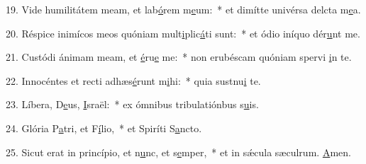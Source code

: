 19. Vide humilitátem meam, et lab\uline{ó}rem m\uline{e}um:~* et dimítte univérsa delcta m\uline{e}a.\par 
20. Réspice inimícos meos quóniam mult\uline{i}plic\uline{á}ti sunt:~* et ódio iníquo dér\uline{u}nt me.\par 
21. Custódi ánimam meam, et \uline{é}ru\uline{e} me:~* non erubéscam quóniam spervi \uline{i}n te.\par 
22. Innocéntes et recti adhæs\uline{é}runt m\uline{i}hi:~* quia sustnu\uline{i} te.\par 
23. Líbera, D\uline{e}us, \uline{I}sraël:~* ex ómnibus tribulatiónbus s\uline{u}is.\par 
24. Glória P\uline{a}tri, et F\uline{í}lio,~* et Spiríti S\uline{a}ncto.\par 
25. Sicut erat in princípio, et n\uline{u}nc, et s\uline{e}mper,~* et in sǽcula sæculrum. \uline{A}men.\par 
